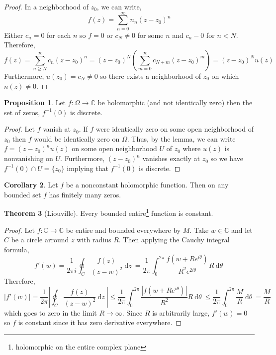 \documentclass{article}
\newcommand{\C}{\mathbb{C}}
\renewcommand{\d}[1]{\: \mathrm{d}#1 \:}
\theoremstyle{definition}
\newtheorem{theorem}{Theorem}[section]
\newtheorem{proposition}[theorem]{Proposition}
\newtheorem{corollary}[theorem]{Corollary}
\begin{document}
\begin{proof}
In a neighborhood of $z_0$, we can write,
\[ f(z) = \sum_{n = 0}^\infty n_n(z - z_0)^n\]
Either $c_n = 0$ for each $n$ so $f = 0$ or $c_N \neq 0$ for some $n$ and $c_n - 0$ for $n < N$. Therefore,
\[ f(z) = \sum_{n \ge N}^\infty c_n(z - z_0)^n = (z - z_0)^N \left( \sum_{m = 0}^\infty c_{N + m} (z - z_0)^m \right) = (z - z_0)^N u(z) \]
Furthermore, $u(z_0) = c_N \neq 0$ so there exists a neighborhood of $z_0$ on which $n(z) \neq 0$.  
\end{proof}


\begin{proposition}
Let $f : \Omega \to \C$ be holomorphic (and not identically zero) then the set of zeros, $f^{-1}(0)$ is discrete.
\end{proposition}

\begin{proof}
Let $f$ vanish at $z_0$. If $f$ were identically zero on some open neighborhood of $z_0$ then $f$ would be identically zero on $\Omega$. Thus, by the lemma, we can write $f = (z - z_0)^n u(z)$ on some open neighborhood $U$ of $z_0$ where $u(z)$ is nonvanishing on $U$. Furthermore, $(z - z_0)^n$ vanishes exactly at $z_0$ so we have $f^{-1}(0) \cap U = \{ z_0 \}$ implying that $f^{-1}(0)$ is discrete. 
\end{proof}

\begin{corollary}
Let $f$ be a nonconstant holomorphic function. Then on any bounded set $f$ has finitely many zeros.
\end{corollary}

\begin{theorem}[Liouville]
Every bounded entire\footnote{holomorphic on the entire complex plane} function is constant.
\end{theorem}

\begin{proof}
Let $f : \C \to \C$ be entire and bounded everywhere by $M$. Take $w \in \C$ and let $C$ be a circle arround $z$ with radius $R$. Then applying the Cauchy integral formula,
\[ f'(w) = \frac{1}{2 \pi i} \oint_C \frac{f(z)}{(z - w)^2} \d{z} = \frac{1}{2 \pi} \int_0^{2 \pi} \frac{f(w + R e^{i \theta})}{R^2 e^{2 i \theta}} R \d{\theta} \]
Therefore,
\[ |f'(w)| = \frac{1}{2 \pi} \left| \oint_C \frac{f(z)}{(z - w)^2} \d{z} \right| \le \frac{1}{2 \pi} \int_0^{2 \pi} \frac{|f(w + R e^{i \theta})|}{R^2} R \d{\theta} \le \frac{1}{2 \pi} \int_0^{2 \pi} \frac{M}{R} \d{\theta} = \frac{M}{R} \]
which goes to zero in the limit $R \to \infty$. Since $R$ is arbitrarily large, $f'(w) = 0$ so $f$ is constant since it has zero derivative everywhere. 
\end{proof}
\end{document}
